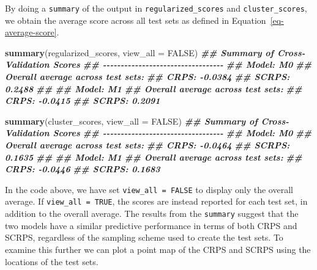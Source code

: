 \documentclass[
  letterpaper,
]{krantz}
\newenvironment{Shaded}{\begin{snugshade}}{\end{snugshade}}
\newcommand{\AttributeTok}[1]{\textcolor[rgb]{0.13,0.29,0.53}{#1}}
\newcommand{\ConstantTok}[1]{\textcolor[rgb]{0.56,0.35,0.01}{#1}}
\newcommand{\DocumentationTok}[1]{\textcolor[rgb]{0.56,0.35,0.01}{\textbf{\textit{#1}}}}
\newcommand{\FunctionTok}[1]{\textcolor[rgb]{0.13,0.29,0.53}{\textbf{#1}}}
\newcommand{\NormalTok}[1]{#1}
\begin{document}
By doing a \texttt{summary} of the output in
\texttt{regularized\_scores} and \texttt{cluster\_scores}, we obtain the
average score across all test sets as defined in
Equation~\ref{eq-average-score}.

\begin{Shaded}
\begin{Highlighting}[]
\FunctionTok{summary}\NormalTok{(regularized\_scores, }\AttributeTok{view\_all =} \ConstantTok{FALSE}\NormalTok{)}
\DocumentationTok{\#\# Summary of Cross{-}Validation Scores}
\DocumentationTok{\#\# {-}{-}{-}{-}{-}{-}{-}{-}{-}{-}{-}{-}{-}{-}{-}{-}{-}{-}{-}{-}{-}{-}{-}{-}{-}{-}{-}{-}{-}{-}{-}{-}{-}{-}}
\DocumentationTok{\#\# Model: M0}
\DocumentationTok{\#\#   Overall average across test sets:}
\DocumentationTok{\#\#     CRPS: {-}0.0384}
\DocumentationTok{\#\#     SCRPS: 0.2488}
\DocumentationTok{\#\# }
\DocumentationTok{\#\# Model: M1}
\DocumentationTok{\#\#   Overall average across test sets:}
\DocumentationTok{\#\#     CRPS: {-}0.0415}
\DocumentationTok{\#\#     SCRPS: 0.2091}

\FunctionTok{summary}\NormalTok{(cluster\_scores, }\AttributeTok{view\_all =} \ConstantTok{FALSE}\NormalTok{)}
\DocumentationTok{\#\# Summary of Cross{-}Validation Scores}
\DocumentationTok{\#\# {-}{-}{-}{-}{-}{-}{-}{-}{-}{-}{-}{-}{-}{-}{-}{-}{-}{-}{-}{-}{-}{-}{-}{-}{-}{-}{-}{-}{-}{-}{-}{-}{-}{-}}
\DocumentationTok{\#\# Model: M0}
\DocumentationTok{\#\#   Overall average across test sets:}
\DocumentationTok{\#\#     CRPS: {-}0.0464}
\DocumentationTok{\#\#     SCRPS: 0.1635}
\DocumentationTok{\#\# }
\DocumentationTok{\#\# Model: M1}
\DocumentationTok{\#\#   Overall average across test sets:}
\DocumentationTok{\#\#     CRPS: {-}0.0446}
\DocumentationTok{\#\#     SCRPS: 0.1683}
\end{Highlighting}
\end{Shaded}

In the code above, we have set \texttt{view\_all\ =\ FALSE} to display
only the overall average. If \texttt{view\_all\ =\ TRUE}, the scores are
instead reported for each test set, in addition to the overall average.
The results from the \texttt{summary} suggest that the two models have a
similar predictive performance in terms of both CRPS and SCRPS,
regardless of the sampling scheme used to create the test sets. To
examine this further we can plot a point map of the CRPS and SCRPS using
the locations of the test sets.
\end{document}

